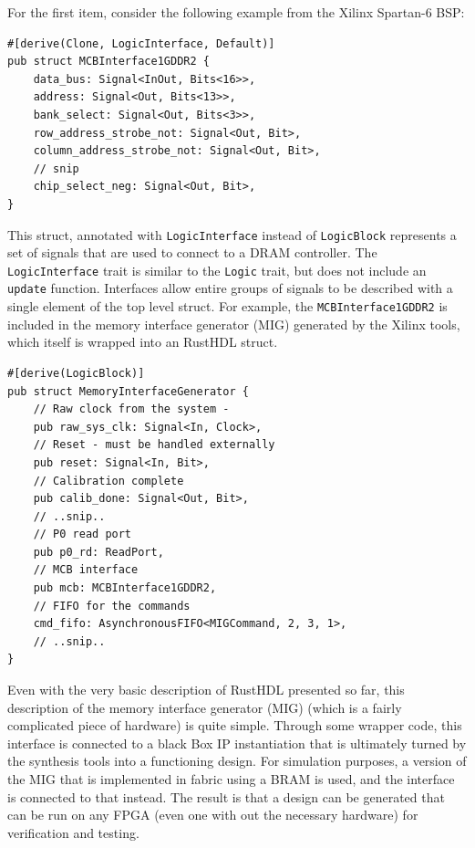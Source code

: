 \documentclass[conference]{IEEEtran}
\begin{document}
For the first item, consider the following example from the Xilinx Spartan-6 BSP:

\begin{verbatim}
#[derive(Clone, LogicInterface, Default)]
pub struct MCBInterface1GDDR2 {
    data_bus: Signal<InOut, Bits<16>>,
    address: Signal<Out, Bits<13>>,
    bank_select: Signal<Out, Bits<3>>,
    row_address_strobe_not: Signal<Out, Bit>,
    column_address_strobe_not: Signal<Out, Bit>,
    // snip
    chip_select_neg: Signal<Out, Bit>,
}
\end{verbatim}

This struct, annotated with \verb|LogicInterface| instead of \verb|LogicBlock| represents a set of signals that are used
to connect to a DRAM controller.  The \verb|LogicInterface| trait is similar to the \verb|Logic| trait, but does not include
an \verb|update| function.  Interfaces allow entire groups of signals to be described with a single element of the
top level struct.  For example, the \verb|MCBInterface1GDDR2| is included in the memory interface generator (MIG) generated 
by the Xilinx tools, which itself is wrapped into an RustHDL struct.

\begin{verbatim}
#[derive(LogicBlock)]
pub struct MemoryInterfaceGenerator {
    // Raw clock from the system - 
    pub raw_sys_clk: Signal<In, Clock>,
    // Reset - must be handled externally
    pub reset: Signal<In, Bit>,
    // Calibration complete
    pub calib_done: Signal<Out, Bit>,
    // ..snip..
    // P0 read port
    pub p0_rd: ReadPort,
    // MCB interface
    pub mcb: MCBInterface1GDDR2,
    // FIFO for the commands
    cmd_fifo: AsynchronousFIFO<MIGCommand, 2, 3, 1>,
    // ..snip..
}
\end{verbatim}  

Even with the very basic description of RustHDL presented so far, this description of the memory interface generator (MIG) (which is a
fairly complicated piece of hardware) is quite simple.   Through some wrapper code, this interface is connected to a black Box
IP instantiation that is ultimately turned by the synthesis tools into a functioning design.  For simulation purposes, a version 
of the MIG that is implemented in fabric using a BRAM is used, and the interface is connected to that instead.  The result is that
a design can be generated that can be run on any FPGA (even one with out the necessary hardware) for verification and testing.
\end{document}
